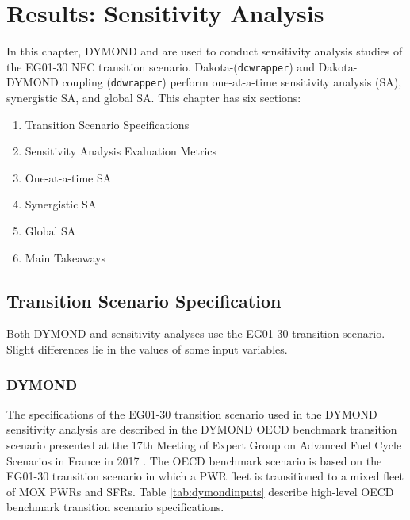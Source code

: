 \chapter{Results: Sensitivity Analysis}
In this chapter, DYMOND and \Cyclus are used to conduct 
sensitivity analysis studies of the 
EG01-30 \gls{NFC} transition scenario. 
Dakota-\Cyclus (\texttt{dcwrapper}) 
and Dakota-DYMOND coupling (\texttt{ddwrapper})
perform  
one-at-a-time sensitivity analysis (SA), synergistic 
SA, and global SA. 
This chapter has six sections: 
\begin{enumerate}
    \item Transition Scenario Specifications 
    \item Sensitivity Analysis Evaluation Metrics 
    \item One-at-a-time \gls{SA}
    \item Synergistic \gls{SA}
    \item Global \gls{SA}
    \item Main Takeaways 
\end{enumerate}

\section{Transition Scenario Specification}
Both DYMOND and \Cyclus sensitivity analyses 
use the EG01-30 transition scenario.
Slight differences lie in the values of some input variables. 

\subsection{DYMOND}
The specifications of the EG01-30 transition scenario used in the 
DYMOND sensitivity analysis
are described in the DYMOND OECD benchmark transition 
scenario presented at the 17th Meeting of Expert Group on Advanced 
Fuel Cycle Scenarios in France in 2017 
\cite{oecd_nuclear_energy_agency_wpfc_nodate}. 
The OECD benchmark scenario is based on the EG01-30 transition scenario 
in which a \gls{PWR} fleet is transitioned to
a mixed fleet of \gls{MOX} \glspl{PWR} and \glspl{SFR}. 
Table \ref{tab:dymondinputs} describe high-level OECD benchmark transition 
scenario specifications. 

